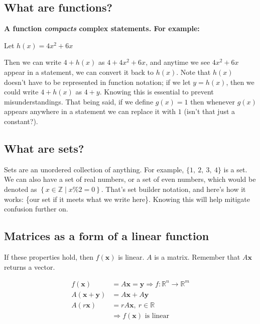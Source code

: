 \documentclass[12pt]{article}
\theoremstyle{plain}
\theoremstyle{remark}
\theoremstyle{definition}
\begin{document}
\subsection{What are functions?}

\textbf{A function \emph{compacts} complex statements. For example:}

Let \(h(x) = 4x^{2} + 6x\)

Then we can write \(4 + h(x)\) as \(4 + 4x^{2} + 6x\), and anytime we
see \(4x^{2} + 6x\) appear in a statement, we can convert it back to
\(h(x)\). Note that \(h(x)\) doesn't have to be represented in function
notation; if we let \(y = h(x)\), then we could write \(4 + h(x)\) as
\(4 + y\). Knowing this is essential to prevent misunderstandings. That
being said, if we define \(g(x) = 1\) then whenever \(g(x)\) appears
anywhere in a statement we can replace it with \(1\) (isn't that just a
constant?).


\subsection{What are sets?}

Sets are an unordered collection of anything. For example,
\(\{ 1,\ 2,\ 3,\ 4\}\) is a set. We can also have a set of real numbers,
or a set of even numbers, which would be denoted as
\(\left\{ x\mathbb{\in Z}\mid x\% 2 = 0 \right\}\). That's set builder
notation, and here's how it works: \{our set \textbar{} if it meets what
we write here\}. Knowing this will help mitigate confusion further on.


\subsection{Matrices as a form of a linear
function}

If these properties hold, then \(f(\mathbf{x})\) is linear. \(A\) is
a matrix. Remember that \(A\mathbf{x}\) returns a vector.

\begin{align*}
f\left( \mathbf{x} \right) &= A\mathbf{x} = \mathbf{y} \Rightarrow f:\mathbb{R}^{n} \rightarrow \mathbb{R}^{m} \\
A\left( \mathbf{x} + \mathbf{y} \right) &= A\mathbf{x} + A\mathbf{y} \\
A\left( r\mathbf{x} \right) &= rA\mathbf{x},\ r\mathbb{\in R} \\
&\Rightarrow f\left( \mathbf{x} \right)\text{\ is\ linear}
\end{align*}
\end{document}
